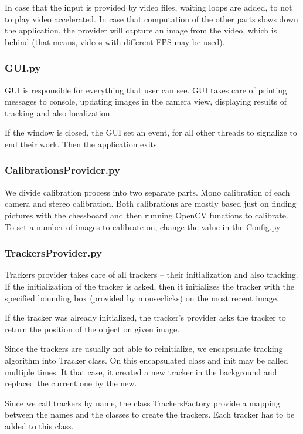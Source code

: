 In case that the input is provided by video files, waiting loops are added, to
not to play video accelerated. In case that computation of the other parts
slows down the application, the provider will capture an image from the video,
which is behind (that means, videos with different FPS may be used).

\subsubsection*{GUI.py}

GUI is responsible for everything that user can see. GUI takes care of printing
messages to console, updating images in the camera view, displaying results of
tracking and also localization.

If the window is closed, the GUI set an event, for all other threads to
signalize to end their work. Then the application exits.

\subsubsection*{CalibrationsProvider.py}

We divide calibration process into two separate parts. Mono calibration of each
camera and stereo calibration. Both calibrations are mostly based just on
finding pictures with the chessboard and then running OpenCV functions to
calibrate. To set a number of images to calibrate on, change the value in the
Config.py

\subsubsection*{TrackersProvider.py}

Trackers provider takes care of all trackers -- their initialization and also
tracking. If the initialization of the tracker is asked, then it initializes
the tracker with the specified bounding box (provided by mouseclicks) on the
most recent image.

If the tracker was already initialized, the tracker's provider asks the tracker
to return the position of the object on given image.

Since the trackers are usually not able to reinitialize, we encapsulate
tracking algorithm into Tracker class. On this encapsulated class and init may
be called multiple times. It that case, it created a new tracker in the
background and replaced the current one by the new.

Since we call trackers by name, the class TrackersFactory provide a mapping
between the names and the classes to create the trackers. Each tracker has to
be added to this class.

